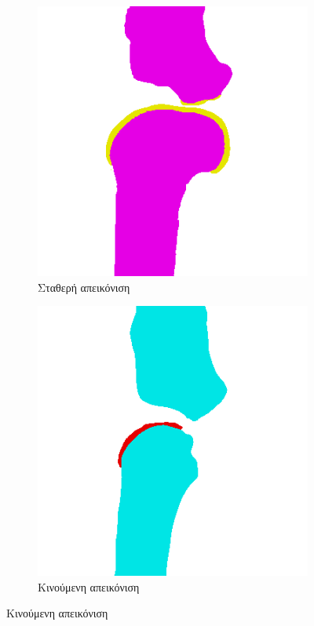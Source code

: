 \documentclass[a4paper,12pt]{article}
\begin{document}
\begin{figure}[H]
    \centering

    \begin{subfigure}[t]{0.4\linewidth}
    \includegraphics[width=\linewidth]{original_label_registration_1.png}
    \caption{Σταθερή απεικόνιση}
    \end{subfigure}
    \begin{subfigure}[t]{0.4\linewidth}
    \includegraphics[width=\linewidth]{moving_label_before_registration_1.png}
    \caption{Κινούμενη απεικόνιση}
    \end{subfigure}


\end{figure}
\end{document}
